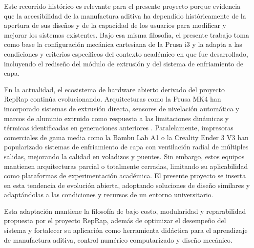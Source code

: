 Este recorrido histórico es relevante para el presente proyecto porque evidencia que la accesibilidad de la manufactura aditiva ha dependido históricamente de la apertura de sus diseños y de la capacidad de los usuarios para modificar y mejorar los sistemas existentes. Bajo esa misma filosofía, el presente trabajo toma como base la configuración mecánica cartesiana de la Prusa i3 y la adapta a las condiciones y criterios específicos del contexto académico en que fue desarrollado, incluyendo el rediseño del módulo de extrusión y del sistema de enfriamiento de capa.

En la actualidad, el ecosistema de hardware abierto derivado del proyecto RepRap continúa evolucionando. Arquitecturas como la Prusa MK4 han incorporado sistemas de extrusión directa, sensores de nivelación automática y marcos de aluminio extruido como respuesta a las limitaciones dinámicas y térmicas identificadas en generaciones anteriores \cite{prusaMK4}. Paralelamente, impresoras comerciales de gama media como la Bambu Lab A1 \cite{bambu_a1} o la Creality Ender 3 V3 \cite{creality_ender3v3} han popularizado sistemas de enfriamiento de capa con ventilación radial de múltiples salidas, mejorando la calidad en voladizos y puentes. Sin embargo, estos equipos mantienen arquitecturas parcial o totalmente cerradas, limitando su aplicabilidad como plataformas de experimentación académica. El presente proyecto se inserta en esta tendencia de evolución abierta, adoptando soluciones de diseño similares y adaptándolas a las condiciones y recursos de un entorno universitario.

Esta adaptación mantiene la filosofía de bajo costo, modularidad y reparabilidad propuesta por el proyecto RepRap, además de optimizar el desempeño del sistema y fortalecer su aplicación como herramienta didáctica para el aprendizaje de manufactura aditiva, control numérico computarizado y diseño mecánico.


